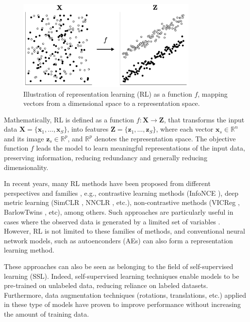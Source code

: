 \documentclass[journal,article,submit,pdftex,moreauthors]{Definitions/mdpi}
\begin{document}
\begin{figure}[H]
	\centering
	\includegraphics[width=9cm]{figures/representation_learning.pdf}
	 \caption{Illustration of representation learning (RL) as a function $f$, mapping vectors from a dimensional space to a representation space.}
	\label{}      
	\centering
\end{figure}

Mathematically, \ac{RL} is defined as a function $f : \mathbf{X} \to \mathbf{Z}$, that transforms the input data $\mathbf{X} = \{\mathbf{x}_1, \dots, \mathbf{x}_S\}$, into features $\mathbf{Z} = \{\mathbf{z}_1, \dots, \mathbf{z}_S\}$, where each vector $\mathbf{x}_s \in \mathbb{R}^n$ and its image $\mathbf{z}_s \in \mathbb{R}^p$, and $\mathbb{R}^p$ denotes the representation space.
The objective function $f$ leads the model to learn meaningful representations of the input data, preserving information, reducing redundancy and generally reducing dimensionality.

In recent years, many \ac{RL} methods have been proposed from different perspectives and families \cite{Balestriero2023}, 
e.g., contrastive learning methods (InfoNCE \cite{Tschannen2019,LeKhac2020,Aitchison2021}), deep metric learning (SimCLR \cite{Chen2020,Bachman2019}, NNCLR \cite{Dwibedi2021}, etc.), non-contrastive methods (VICReg \cite{Bardes2021}, BarlowTwins \cite{Zbontar2021,Lisaius2024}, etc), among others.
Such approaches are particularly useful in cases where the observed data is generated by a limited set of variables \cite{Coifman2006}. 
However, \ac{RL} is not limited to these families of methods, and conventional neural network models, such as autoenconders (AEs) can also form a representation learning method.

These approaches can also be seen as belonging to the field of self-supervised learning (SSL). Indeed, self-supervised learning techniques enable models to be pre-trained on unlabeled data, reducing reliance on labeled datasets. Furthermore, data augmentation techniques (rotations, translations, etc.) applied in these type of models have proven to improve performance without increasing the amount of training data.
\end{document}
